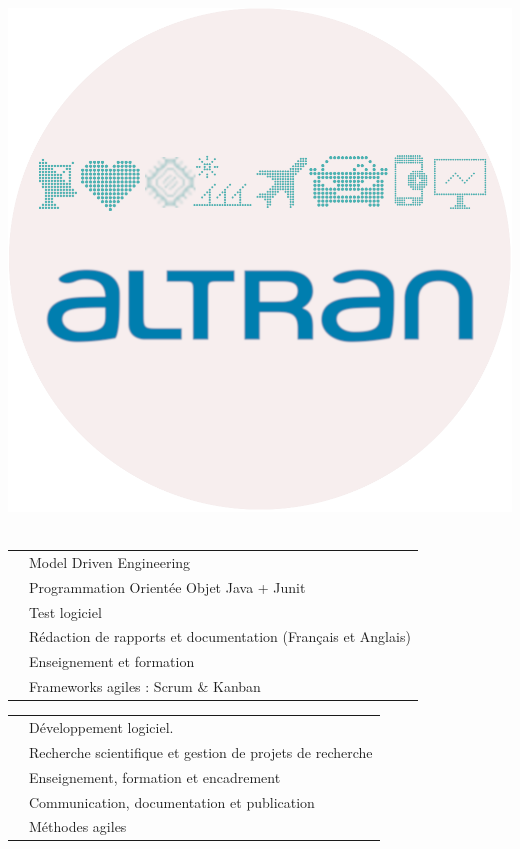 \begin{minipage}{0.45\textwidth}
\begin{flushright}
\includegraphics[scale=0.8]{img/altran.png}~~~~~~~~
\end{flushright}
\end{minipage}


\tair

\sectionline{}

\tair


\begin{tabular}{r @{~$\rangle$~} p{}}
 & Model Driven Engineering \\
 & Programmation Orientée Objet Java + Junit \\
 & Test logiciel \\
 & Rédaction de rapports et documentation (Français et Anglais) \\
 & Enseignement et formation \\
 & Frameworks agiles : Scrum \& Kanban \\
\end{tabular}

\tair


\begin{tabular}{r @{~$\rangle$~} p{}}
 & Développement logiciel. \\
 & Recherche scientifique et gestion de projets de recherche \\
 & Enseignement, formation et encadrement \\
 & Communication, documentation et publication \\
 & Méthodes agiles \\
\end{tabular}

